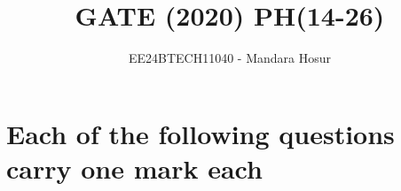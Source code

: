 \documentclass[journal]{IEEEtran}
\begin{document}

\vspace{3cm}

\title{GATE (2020) PH(14-26)}
\author{EE24BTECH11040 - Mandara Hosur}
{\let\newpage\relax\maketitle}

\renewcommand{\thefigure}{\theenumi}
\renewcommand{\thetable}{\theenumi}
\setlength{\intextsep}{10pt} %


\renewcommand{\thetable}{\theenumi}

\section*{\textbf{Each of the following questions carry one mark each}}
\end{document}
